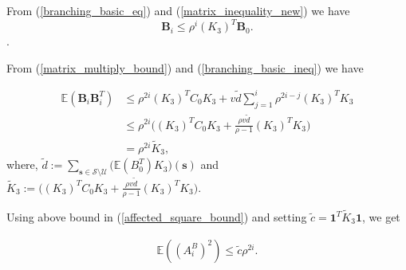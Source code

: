 \documentclass{article}
\theoremstyle{definition}
\newcommand{\lrp}[1]{\left({#1}\right)}
\newcommand{\abs}[1]{\left\lvert{#1}\right\rvert}
\newcommand{\Exp}[1]{\mathbb{E}\lrp{#1}}
\begin{document}
From (\ref{branching_basic_eq}) and (\ref{matrix_inequality_new}) we have  \begin{equation}
  \bm{B}_i \leq \rho^i (K_3)^T \bm{B}_0.
  \label{branching_basic_ineq}
\end{equation}.  

From (\ref{matrix_multiply_bound}) and (\ref{branching_basic_ineq}) we have


\begin{equation*}
    \begin{aligned}
    \Exp{\bm{{B}}_{i} \bm{{B}}^T_{i}} & \le \rho^{2i} (K_3)^T C_0 K_3 + v \tilde{d} \sum_{j=1}^{i} \rho^{2i-j} (K_3)^T  K_3\\
    & \le  \rho^{2i} \bigg((K_3)^T C_0 K_3 + \frac{\rho v \tilde{d}}{\rho-1}  (K_3)^T  K_3 \bigg)\\
    & = \rho^{2i} \tilde{K}_3,
    \label{eq:BBT3} 
    \end{aligned}
\end{equation*}
where, $\tilde{d} := \sum_{\bm{s}\in\mathcal S \setminus  \mathcal U} \Big(\Exp{{B}_0^T} K_3\Big)(\bm{s})$ and $\tilde{K}_3 := \bigg((K_3)^T C_0 K_3 + \frac{\rho v \tilde{d}}{\rho-1}  (K_3)^T  K_3\bigg)$. 
 
 

 Using above bound in (\ref{affected_square_bound}) and setting $\tilde{c}=\bm{1}^T \tilde{K}_3 \bm{1}$, we get
 
 \begin{equation*}
    \begin{aligned}\Exp{\lrp{A^B_i}^2} \leq \tilde{c} \rho^{2i}. 
    \end{aligned}
\end{equation*}
 
 



   
\end{document}
